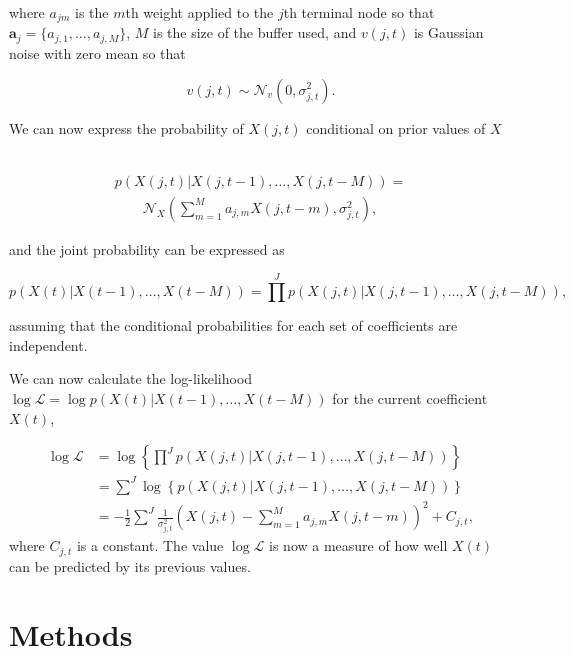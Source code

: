 where $a_{jm}$ is the $m$th weight applied to the $j$th terminal node so that $\mathbf{a}_j = \{a_{j,1}, \ldots, a_{j,M} \}$, $M$ is the size of the buffer used, and $v(j,t)$ is Gaussian noise with zero mean so that

\begin{equation}\label{eq:lpmnoise}
v(j,t) \sim \mathcal{N}_v(0,\sigma^2_{j,t}).
\end{equation}

We can now express the probability of $X(j,t)$ conditional on prior values of $X$ \DIFdelbegin {}%

\DIFdelend \DIFaddbegin {}\
\DIFaddend \begin{align}\label{eq:likelihood}
p\left(X\left(j,t\right)|X\left(j,t-1\right),\ldots,X\left(j,t-M\right)\right) = \nonumber\\
\qquad \mathcal{N}_X\left( \sum_{m=1}^M a_{j,m} X(j,t - m), \sigma_{j,t}^2\right),
\end{align}

and the joint probability can be expressed as

\begin{equation}\label{eq:marginal}
p\left(X(t)|X\left(t-1\right),\ldots,X\left(t-M\right)\right) = \prod^J p\left(X\left(j,t\right)|X\left(j,t-1\right),\ldots,X\left(j,t-M\right)\right),
\end{equation}

assuming that the conditional probabilities for each set of coefficients are independent.

We can now calculate the log-likelihood $\log\mathcal{L} = \log{p\left(X(t)|X\left(t-1\right),\ldots,X\left(t-M\right)\right)}$ for the current coefficient $X(t)$,

\begin{align}\label{eq:loglike}
\log \mathcal{L} &= \log \left\{ \prod^J p \left( X(j,t) | X(j,t-1),\ldots,X(j,t-M) \right) \right\} \\
&=  \sum^J \log \left\{p \left( X(j,t) | X(j,t-1),\ldots,X(j,t-M) \right) \right\}\nonumber\\
&=  -\frac{1}{2} \sum^J \frac{1}{\sigma_{j,t}^2}\left(X(j,t) -  \sum_{m=1}^{M} a_{j,m} X(j,t - m) \right)^2 + C_{j,t}\nonumber,
\end{align}
where $C_{j,t}$ is a constant. The value $\log \mathcal{L}$ is now a measure of how well $X(t)$ can be predicted by its previous values.

\section{Methods}\label{sec:WPmethods} %
